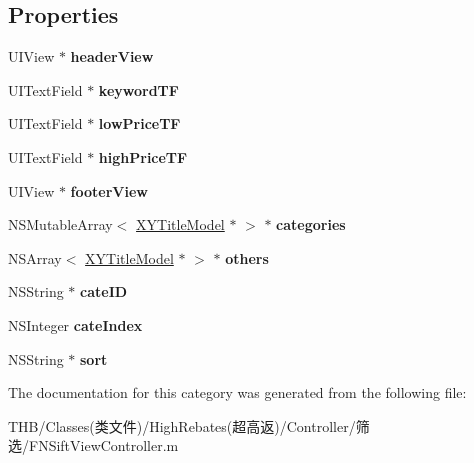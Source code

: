 \subsection*{Properties}
\begin{DoxyCompactItemize}
\item 
\mbox{\label{category_f_n_sift_view_controller_07_08_a470d05b48ac5789f553c17b734665da5}} 
U\+I\+View $\ast$ {\bfseries header\+View}
\item 
\mbox{\label{category_f_n_sift_view_controller_07_08_ae8b5df37b0f088c81b1c0f5eadab31ca}} 
U\+I\+Text\+Field $\ast$ {\bfseries keyword\+TF}
\item 
\mbox{\label{category_f_n_sift_view_controller_07_08_a00a01991c8fcc6bb01dae554db1e97d2}} 
U\+I\+Text\+Field $\ast$ {\bfseries low\+Price\+TF}
\item 
\mbox{\label{category_f_n_sift_view_controller_07_08_a2c591ae74c0c716307f0da6b0518d2bb}} 
U\+I\+Text\+Field $\ast$ {\bfseries high\+Price\+TF}
\item 
\mbox{\label{category_f_n_sift_view_controller_07_08_aba053bd857fbab8cc9d1ac2ac35a2aa3}} 
U\+I\+View $\ast$ {\bfseries footer\+View}
\item 
\mbox{\label{category_f_n_sift_view_controller_07_08_a8ab2fe920c69267cd16e49659e04134f}} 
N\+S\+Mutable\+Array$<$ \mbox{\hyperlink{interface_x_y_title_model}{X\+Y\+Title\+Model}} $\ast$ $>$ $\ast$ {\bfseries categories}
\item 
\mbox{\label{category_f_n_sift_view_controller_07_08_a3d9b1c2d652aff41319cf3fc15910056}} 
N\+S\+Array$<$ \mbox{\hyperlink{interface_x_y_title_model}{X\+Y\+Title\+Model}} $\ast$ $>$ $\ast$ {\bfseries others}
\item 
\mbox{\label{category_f_n_sift_view_controller_07_08_ad2360794f61c5eb5da5d0b1b5ca36ee0}} 
N\+S\+String $\ast$ {\bfseries cate\+ID}
\item 
\mbox{\label{category_f_n_sift_view_controller_07_08_aaef1942315a112b802c34e1eb3660a00}} 
N\+S\+Integer {\bfseries cate\+Index}
\item 
\mbox{\label{category_f_n_sift_view_controller_07_08_ab0c286846aeabf1d637633f6e36cc188}} 
N\+S\+String $\ast$ {\bfseries sort}
\end{DoxyCompactItemize}


The documentation for this category was generated from the following file\+:\begin{DoxyCompactItemize}
\item 
T\+H\+B/\+Classes(类文件)/\+High\+Rebates(超高返)/\+Controller/筛选/F\+N\+Sift\+View\+Controller.\+m\end{DoxyCompactItemize}
